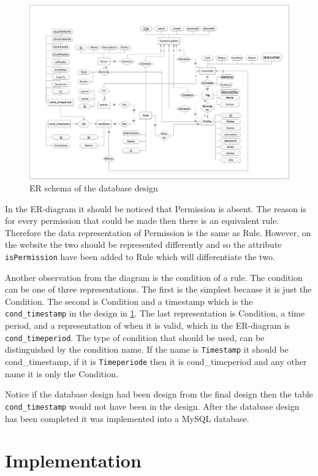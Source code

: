 \begin{figure}
	\centering
		\includegraphics[width=1.50\textwidth,  angle=90]{images/ERdiagram.jpg}
	\caption{ER schema of the database design}
	\label{fig:ERdiagram}
\end{figure}

In the ER-diagram it should be noticed that Permission is absent. The reason is for every permission that could be made then there is an equivalent rule. Therefore the data representation of Permission is the same as Rule. However, on the website the two should be represented differently and so the attribute \texttt{isPermission} have been added to Rule which will differentiate the two.

Another observation from the diagram is the condition of a rule. The condition can be one of three representations. The first is the simplest because it is just the Condition. The second is Condition and a timestamp which is the \texttt{cond\_timestamp} in the design in \ref{fig:ERdiagram}. The last representation is Condition, a time period, and a representation of when it is valid, which in the ER-diagram is \texttt{cond\_timeperiod}. The type of condition that should be used, can be distinguished by the condition name. If the name is \texttt{Timestamp} it should be cond\_timestamp, if it is \texttt{Timeperiode} then it is cond\_timeperiod and any other name it is only the Condition. 

Notice if the database design had been design from the final design then the table \texttt{cond\_timestamp} would not have been in the design.
After the database design has been completed it was implemented into a MySQL database.  

\section{Implementation}

